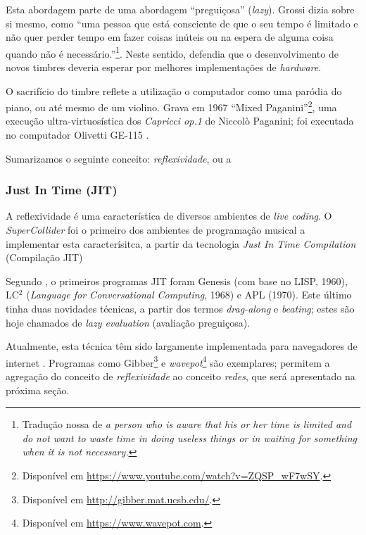 Esta abordagem parte de uma abordagem ``preguiçosa'' (\emph{lazy}). Grossi dizia sobre si mesmo, como ``uma pessoa que está consciente de que o seu tempo é limitado e não quer perder tempo em fazer coisas inúteis ou na espera de alguma coisa quando não é necessário.''\footnote{Tradução nossa de \emph{a person who is aware that his or her time is limited and do not want to waste time in doing useless things or in waiting for something when it is not necessary.}}. Neste sentido, defendia que o desenvolvimento de novos timbres deveria esperar por melhores implementações de \emph{hardware}.

O sacrifício do timbre reflete a utilização o computador como uma paródia do piano, ou até mesmo de um violino. Grava em 1967 ``Mixed Paganini''\footnote{Disponível em \url{https://www.youtube.com/watch?v=ZQSP_wF7wSY}.}, uma execução ultra-virtuosística dos \emph{Capricci op.1} de Niccolò Paganini; foi executada no computador Olivetti GE-115 .

Sumarizamos o seguinte conceito: \emph{reflexividade}, ou a 

\subsubsection{Just In Time (JIT)}\label{sec:jit}

A reflexividade é uma característica de diversos ambientes de \emph{live coding}. O \emph{SuperCollider} foi o primeiro dos ambientes de programação musical a implementar esta caracterísitca, a partir da tecnologia \emph{Just In Time Compilation} (Compilação JIT)

Segundo , o primeiros programas JIT foram Genesis (com base no LISP, 1960), LC$^2$ (\emph{Language for Conversational Computing}, 1968) e APL (1970). Este último tinha duas novidades técnicas, a partir dos termos \emph{drag-along} e \emph{beating}; estes são hoje chamados de \emph{lazy evaluation} (avaliação preguiçosa). 

Atualmente, esta técnica têm sido largamente implementada para navegadores de internet \cite{roberts_web_2013}. Programas como Gibber\footnote{Disponível em \url{http://gibber.mat.ucsb.edu/}.} \cite{roberts_gibber:_2012} e \emph{wavepot}\footnote{Disponível em \url{https://www.wavepot.com}.} são exemplares; permitem a agregação do conceito de \emph{reflexividade} ao conceito \emph{redes}, que será apresentado na próxima seção.

